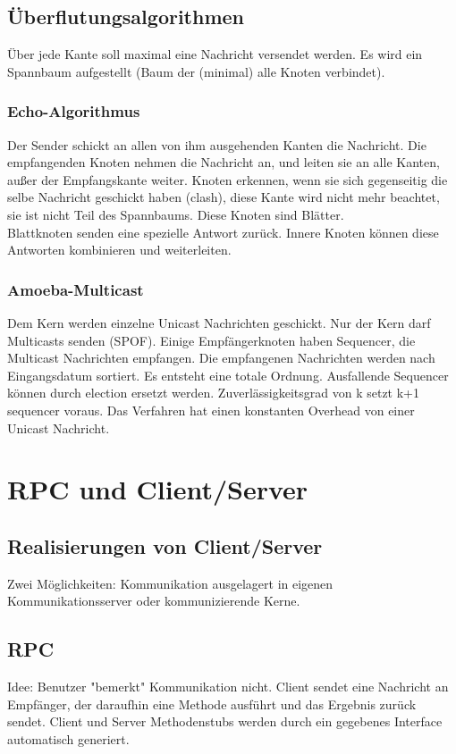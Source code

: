 \documentclass[a4paper]{article}
\begin{document}
\subsection{Überflutungsalgorithmen}
Über jede Kante soll maximal eine Nachricht versendet werden. Es wird ein Spannbaum aufgestellt (Baum der (minimal) alle Knoten verbindet).\\
\subsubsection{Echo-Algorithmus}
Der Sender schickt an allen von ihm ausgehenden Kanten die Nachricht. Die empfangenden Knoten nehmen die Nachricht an, und leiten sie an alle Kanten, außer der Empfangskante weiter. Knoten erkennen, wenn sie sich gegenseitig die selbe Nachricht geschickt haben (clash), diese Kante wird nicht mehr beachtet, sie ist nicht Teil des Spannbaums. Diese Knoten sind Blätter.\\
Blattknoten senden eine spezielle Antwort zurück. Innere Knoten können diese Antworten kombinieren und weiterleiten. 
\subsubsection{Amoeba-Multicast}
Dem Kern werden einzelne Unicast Nachrichten geschickt. Nur der Kern darf Multicasts senden (SPOF). Einige Empfängerknoten haben Sequencer, die Multicast Nachrichten empfangen. Die empfangenen Nachrichten werden nach Eingangsdatum sortiert. Es entsteht eine totale Ordnung. Ausfallende Sequencer können durch election ersetzt werden. Zuverlässigkeitsgrad von k setzt k+1 sequencer voraus. Das Verfahren hat einen konstanten Overhead von einer Unicast Nachricht.
\section{RPC und Client/Server}
\subsection{Realisierungen von Client/Server}
Zwei Möglichkeiten: Kommunikation ausgelagert in eigenen Kommunikationsserver oder kommunizierende Kerne.
\subsection{RPC}
Idee: Benutzer "bemerkt" Kommunikation nicht. 
Client sendet eine Nachricht an Empfänger, der daraufhin eine Methode ausführt und das Ergebnis zurück sendet. Client und Server Methodenstubs werden durch ein gegebenes Interface automatisch generiert.
\end{document}

